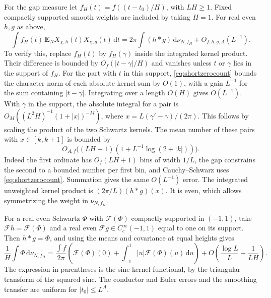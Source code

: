 \documentclass[11pt,a4paper]{article}
\numberwithin{equation}{section}
\newcommand{\ud}{\mathrm d}
\begin{document}
For the gap measure let $f_H(t)=f((t-t_0)/H)$, with $LH\ge1$.
Fixed compactly supported smooth weights are included by
taking $H=1$. For real even $h,g$ as above,
\begin{equation}
 \int f_H(t)\,\mathbf E_N X_{\chi,h}(t)X_{\chi,g}(t)\,\ud t
      =2\pi\int (h*g)\,\ud\nu_{N,f_H}+O_{f,h,g,A}(L^{-1}).
 \label{eq:restrictedgaptransfer}
\end{equation}
To verify this, replace $f_H(t)$ by $f_H(\gamma)$ inside
the integrated kernel product. Their difference is bounded
by $O_f(|t-\gamma|/H)$ and vanishes unless $t$ or $\gamma$
lies in the support of $f_H$. For the part with $t$ in this
support, \cref{eq:shortzerocount} bounds the character norm
of each absolute kernel sum by $O(1)$, with a gain $L^{-1}$
for the sum containing $|t-\gamma|$. Integrating over a
length $O(H)$ gives $O(L^{-1})$. With $\gamma$ in the
support, the absolute integral for a pair is
$O_M((L^2 H)^{-1}(1+|x|)^{-M})$, where
$x=L(\gamma'-\gamma)/(2\pi)$. This follows by scaling the
product of the two Schwartz kernels. The mean number of
these pairs with $x\in[k,k+1]$ is bounded by
\[
 O_{A,f}\bigl((LH+1)(1+L^{-1}\log(2+|k|))\bigr).
\]
Indeed the first ordinate has $O_f(LH+1)$ bins of width
$1/L$, the gap constrains the second to a bounded number
per first bin, and Cauchy--Schwarz uses
\cref{eq:shortzerocount}. Summation gives the same
$O(L^{-1})$ error. The integrated unweighted kernel
product is $(2\pi/L)(h*g)(x)$. It is even, which allows
symmetrizing the weight in $\nu_{N,f_H}$.

For a real even Schwartz $\Phi$ with $\mathcal F(\Phi)$
compactly supported in $(-1,1)$, take $\mathcal Fh
=\mathcal F(\Phi)$ and a real even $\mathcal Fg\in
C_c^\infty(-1,1)$ equal to one on its support.
Then $h*g=\Phi$, and using the means and covariance at
equal heights gives
\begin{equation}
 \frac1H\int\Phi\,\ud\nu_{N,f_H}
   =\frac{\int f}{2\pi}\left(\mathcal F(\Phi)(0)
                   +\int_{-1}^1 |u|\mathcal F(\Phi)(u)\,\ud u\right)
       +O\!\left(\frac{\log L}{L}+\frac1{LH}\right).
 \label{eq:restrictedpairlaw}
\end{equation}
The expression in parentheses is the sine-kernel functional,
by the triangular transform of the squared sinc. The
conductor and Euler errors and the smoothing transfer are
uniform for $|t_0|\le L^A$.
\end{document}
